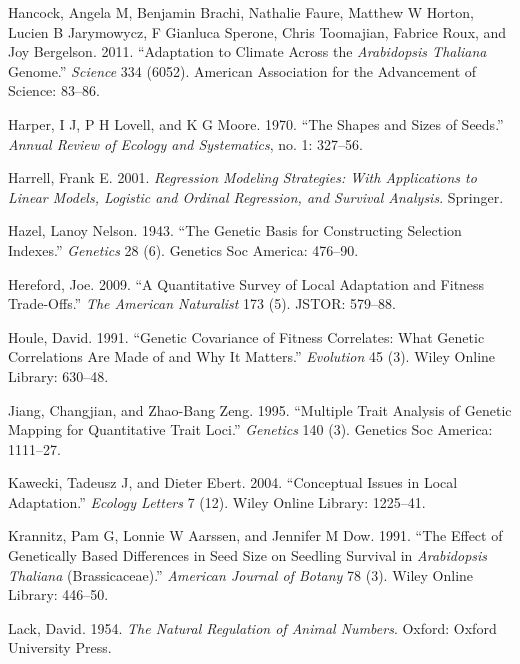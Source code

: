 \documentclass[]{article}
\begin{document}
\leavevmode\hypertarget{ref-hancock2011adaptation}{}%
Hancock, Angela M, Benjamin Brachi, Nathalie Faure, Matthew W Horton, Lucien B Jarymowycz, F Gianluca Sperone, Chris Toomajian, Fabrice Roux, and Joy Bergelson. 2011. ``Adaptation to Climate Across the \emph{Arabidopsis Thaliana} Genome.'' \emph{Science} 334 (6052). American Association for the Advancement of Science: 83--86.

\leavevmode\hypertarget{ref-Harper1970}{}%
Harper, I J, P H Lovell, and K G Moore. 1970. ``The Shapes and Sizes of Seeds.'' \emph{Annual Review of Ecology and Systematics}, no. 1: 327--56.

\leavevmode\hypertarget{ref-harrell2001regression}{}%
Harrell, Frank E. 2001. \emph{Regression Modeling Strategies: With Applications to Linear Models, Logistic and Ordinal Regression, and Survival Analysis}. Springer.

\leavevmode\hypertarget{ref-Hazel1943}{}%
Hazel, Lanoy Nelson. 1943. ``The Genetic Basis for Constructing Selection Indexes.'' \emph{Genetics} 28 (6). Genetics Soc America: 476--90.

\leavevmode\hypertarget{ref-Hereford2009}{}%
Hereford, Joe. 2009. ``A Quantitative Survey of Local Adaptation and Fitness Trade-Offs.'' \emph{The American Naturalist} 173 (5). JSTOR: 579--88.

\leavevmode\hypertarget{ref-Houle1991}{}%
Houle, David. 1991. ``Genetic Covariance of Fitness Correlates: What Genetic Correlations Are Made of and Why It Matters.'' \emph{Evolution} 45 (3). Wiley Online Library: 630--48.

\leavevmode\hypertarget{ref-jiang1995multiple}{}%
Jiang, Changjian, and Zhao-Bang Zeng. 1995. ``Multiple Trait Analysis of Genetic Mapping for Quantitative Trait Loci.'' \emph{Genetics} 140 (3). Genetics Soc America: 1111--27.

\leavevmode\hypertarget{ref-Kawecki2004}{}%
Kawecki, Tadeusz J, and Dieter Ebert. 2004. ``Conceptual Issues in Local Adaptation.'' \emph{Ecology Letters} 7 (12). Wiley Online Library: 1225--41.

\leavevmode\hypertarget{ref-krannitz1991effect}{}%
Krannitz, Pam G, Lonnie W Aarssen, and Jennifer M Dow. 1991. ``The Effect of Genetically Based Differences in Seed Size on Seedling Survival in \emph{Arabidopsis Thaliana} (Brassicaceae).'' \emph{American Journal of Botany} 78 (3). Wiley Online Library: 446--50.

\leavevmode\hypertarget{ref-Lack1954}{}%
Lack, David. 1954. \emph{The Natural Regulation of Animal Numbers}. Oxford: Oxford University Press.
\end{document}
